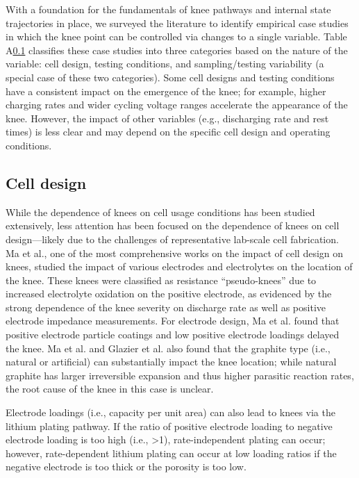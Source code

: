 \documentclass[journal=jpclcd,manuscript=article]{achemso}
\begin{document}
With a foundation for the fundamentals of knee pathways and internal state trajectories in place, we surveyed the literature to identify empirical case studies in which the knee point can be controlled via changes to a single variable. Table A\ref{} classifies these case studies into three categories based on the nature of the variable: cell design, testing conditions, and sampling/testing variability (a special case of these two categories). Some cell designs and testing conditions have a consistent impact on the emergence of the knee; for example, higher charging rates and wider cycling voltage ranges accelerate the appearance of the knee. However, the impact of other variables (e.g., discharging rate and rest times) is less clear and may depend on the specific cell design and operating conditions.

\subsection{Cell design}

While the dependence of knees on cell usage conditions has been studied extensively, less attention has been focused on the dependence of knees on cell design---likely due to the challenges of representative lab-scale cell fabrication. Ma et al.\cite{ma_editors_2019}, one of the most comprehensive works on the impact of cell design on knees, studied the impact of various electrodes and electrolytes on the location of the knee. These knees were classified as resistance ``pseudo-knees'' due to increased electrolyte oxidation on the positive electrode, as evidenced by the strong dependence of the knee severity on discharge rate as well as positive electrode impedance measurements. For electrode design, Ma et al.\cite{ma_editors_2019} found that positive electrode particle coatings and low positive electrode loadings delayed the knee. Ma et al. \cite{ma_editors_2019} and Glazier et al.\cite{glazier_analysis_2017} also found that the graphite type (i.e., natural or artificial) can substantially impact the knee location; while natural graphite has larger irreversible expansion and thus higher parasitic reaction rates\cite{glazier_analysis_2017}, the root cause of the knee in this case is unclear.

Electrode loadings (i.e., capacity per unit area) can also lead to knees via the lithium plating pathway.
If the ratio of positive electrode loading to negative electrode loading is too high (i.e., >1), rate-independent plating can occur\cite{deichmann_investigating_2020}; however, rate-dependent lithium plating can occur at low loading ratios if the negative electrode is too thick or the porosity is too low.\cite{waldmann_mechanical_2014, yang_modeling_2017}
\end{document}
